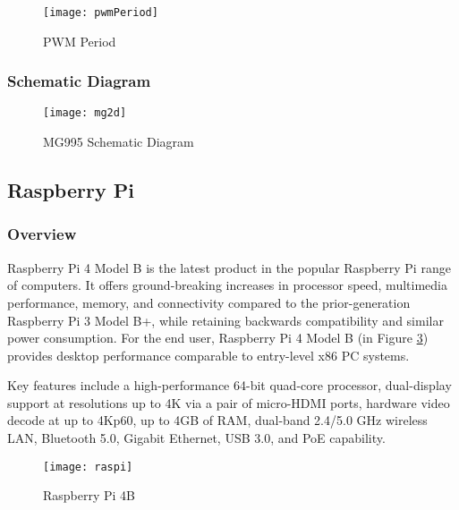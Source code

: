 \begin{figure}[H]
    \centering
        \texttt{[image: pwmPeriod]}
        \caption{PWM Period}
        \label{fig:pwmPeriod}
\end{figure}

\subsubsection{Schematic Diagram} 
\begin{figure}[H]
    \centering
        \texttt{[image: mg2d]}
        \caption{MG995 Schematic Diagram}
        \label{fig:mg2d}
\end{figure}


\newpage
\subsection{Raspberry Pi}
\subsubsection{Overview}

Raspberry Pi 4 Model B is the latest product in the popular Raspberry Pi range of computers. It offers ground-breaking increases in processor speed, multimedia performance, memory, and connectivity compared to the prior-generation Raspberry Pi 3 Model B+, while retaining backwards compatibility and similar power consumption. For the end user, Raspberry Pi 4 Model B (in Figure \ref{fig:raspi}) provides desktop performance comparable to entry-level x86 PC systems.

Key features include a high-performance 64-bit quad-core processor, dual-display support at resolutions up to 4K via a pair of micro-HDMI ports, hardware video decode at up to 4Kp60, up to 4GB of RAM, dual-band 2.4/5.0 GHz wireless LAN, Bluetooth 5.0, Gigabit Ethernet, USB 3.0, and PoE capability.

\begin{figure}[H]
    \centering
        \texttt{[image: raspi]}
        \caption{Raspberry Pi 4B}
        \label{fig:raspi}
\end{figure}

